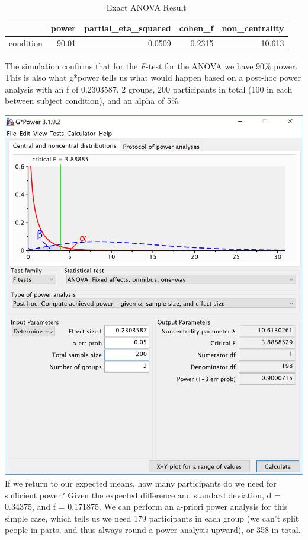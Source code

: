 \documentclass[]{book}
\begin{document}
\begin{table}[t]

\caption{\label{tab:unnamed-chunk-21}Exact ANOVA Result}
\centering
\begin{tabular}{l|r|r|r|r}
\hline
  & power & partial\_eta\_squared & cohen\_f & non\_centrality\\
\hline
condition & 90.01 & 0.0509 & 0.2315 & 10.613\\
\hline
\end{tabular}
\end{table}

The simulation confirms that for the \emph{F}-test for the ANOVA we have 90\% power. This is also what g*power tells us what would happen based on a post-hoc power analysis with an f of 0.2303587, 2 groups, 200 participants in total (100 in each between subject condition), and an alpha of 5\%.

\includegraphics{screenshots/gpower_8.png}
If we return to our expected means, how many participants do we need for sufficient power? Given the expected difference and standard deviation, d = 0.34375, and f = 0.171875. We can perform an a-priori power analysis for this simple case, which tells us we need 179 participants in each group (we can't split people in parts, and thus always round a power analysis upward), or 358 in total.
\end{document}
